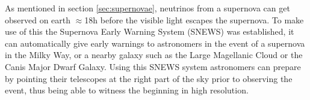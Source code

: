 As mentioned in section \ref{sec:supernovae}, neutrinos from a supernova can
get observed on earth $\approx$18h before the visible light escapes the
supernova. To make use of this the Supernova Early Warning System
(SNEWS)\cite{SNEWS} was established, it can automatically give early warnings
to astronomers in the event of a supernova in the Milky Way, or a nearby galaxy
such as the Large Magellanic Cloud or the Canis Major Dwarf Galaxy.  Using this
SNEWS system astronomers can prepare by pointing their telescopes at the right
part of the sky prior to observing the event, thus being able to witness the
beginning in high resolution.
